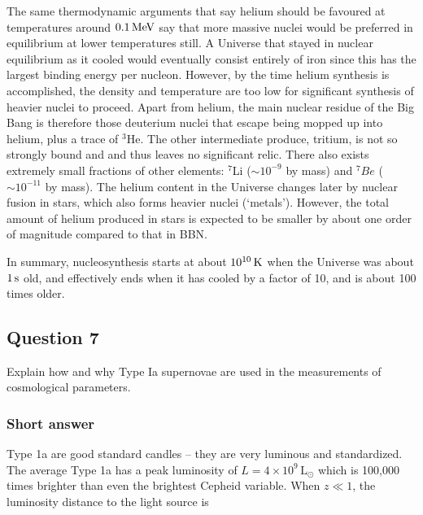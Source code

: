\documentclass[a4paper,11pt]{article}
\begin{document}
{\noindent}The same thermodynamic arguments that say helium should be favoured at temperatures around $0.1\,{\rm MeV}$ say that more massive nuclei would be preferred in equilibrium at lower temperatures still. A Universe that stayed in nuclear equilibrium as it cooled would eventually consist entirely of iron since this has the largest binding energy per nucleon. However, by the time helium synthesis is accomplished, the density and temperature are too low for significant synthesis of heavier nuclei to proceed. Apart from helium, the main nuclear residue of the Big Bang is therefore those deuterium nuclei that escape being mopped up into helium, plus a trace of $^3$He. The other intermediate produce, tritium, is not so strongly bound and and thus leaves no significant relic. There also exists extremely small fractions of other elements: $^7$Li ($\sim10^{-9}$ by mass) and $^7Be$ ($\sim10^{-11}$ by mass). The helium content in the Universe changes later by nuclear fusion in stars, which also forms heavier nuclei (`metals'). However, the total amount of helium produced in stars is expected to be smaller by about one order of magnitude compared to that in BBN.

{\noindent}In summary, nucleosynthesis starts at about $10^{10}\,{\rm K}$ when the Universe was about $1\,{\rm s}$ old, and effectively ends when it has cooled by a factor of 10, and is about 100 times older.

%
%

\newpage
\subsection{Question 7}

Explain how and why Type Ia supernovae are used in the measurements of cosmological parameters.

\subsubsection{Short answer}

Type 1a are good standard candles -- they are very luminous and standardized. The average Type 1a has a peak luminosity of $L=4\times10^9\,\mathrm{L}_\odot$ which is 100,000 times brighter than even the brightest Cepheid variable. When $z\ll1$, the luminosity distance to the light source is
\end{document}
